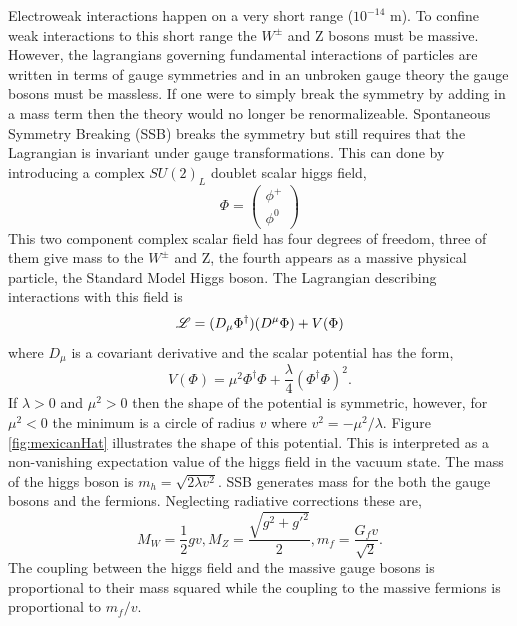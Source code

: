 Electroweak
interactions happen on a very short range ($10^{-14}$ m).
To confine weak interactions to this
short range %
the $W^{\pm}$ and Z bosons must be massive. %
However, the lagrangians governing fundamental interactions
of particles are written in terms of gauge symmetries and %
 in an unbroken gauge theory the gauge bosons must 
be massless. If one were to simply break the symmetry by adding 
in a mass term then the theory %
would no longer be renormalizeable. Spontaneous Symmetry Breaking (SSB)
breaks the symmetry but still requires that the Lagrangian
is invariant under gauge transformations.  
This can done by introducing a complex $SU(2)_{L}$ doublet scalar
higgs field,
\begin{equation}
\Phi=\left(
    \begin{array}{c}
      \phi^{+} \\
      \phi^{0}
    \end{array}
  \right)
\end{equation}
This two component complex scalar field has four degrees
of freedom, three of them give mass to the $W^{\pm}$ and Z, the fourth
appears as a massive physical particle, the Standard Model Higgs boson. 
The Lagrangian describing interactions with this field is 
\begin{equation}
\mathscr{L}=(D_{\mu}\Phi^{\dagger})(D^{\mu}\Phi) +V(\Phi)
\end{equation}
where $D_{\mu}$ is a covariant derivative
and the scalar potential has the form,
\begin{equation}
V(\Phi)=\mu^{2}\Phi^{\dagger}\Phi+\frac{\lambda}{4}(\Phi^{\dagger}\Phi)^{2}.
\end{equation}
If $\lambda>0$ and $\mu^{2}>0$ then the shape of the potential is symmetric, however,
for  $\mu^{2}<0$ the minimum is a circle of radius $v$ where $v^{2}=-\mu^{2}/\lambda$.
Figure \ref{fig:mexicanHat} illustrates the shape of this potential. This is interpreted as
 a non-vanishing expectation value of the higgs field in the vacuum state.
The mass of the higgs boson is $m_{h}=\sqrt{2\lambda v^{2}}$. 
SSB generates mass for the both the gauge bosons and the fermions. Neglecting radiative corrections these are,
\begin{equation}
M_{W}=\frac{1}{2}gv, M_{Z}=\frac{\sqrt{g^{2}+g'^{2}}}{2} , m_{f}=\frac{G_{f}v}{\sqrt{2}}.
\end{equation}
The coupling between the higgs field and the 
massive gauge bosons is proportional to their mass squared while the coupling to the 
massive fermions is proportional to $m_{f}/v$. 


